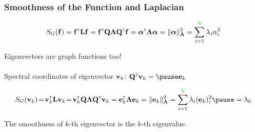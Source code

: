\documentclass{beamer}
\begin{document}

\newcommand{\topictitle}{Normalized Laplacians}

\newcommand{\topicsubtitle}{$L_{\mathrm{sym}}$ and $L_{\mathrm{rw}}$}

\MakeTopicSlide

\begin{frame}
\frametitle{Smoothness of the Function and Laplacian}
\begin{block}{}
$$
S_G(\bff)  = \bff\transpose\bL\bff =
 \bff\transpose\bQ\bLambda\bQ\transpose\bff = 
\balpha\transpose\bLambda\balpha = 
\|\balpha\|^2_{\bLambda}=\sum_{i=1}^\nodes\lambda_i\alpha_i^2
$$
 \end{block}

Eigenvectors are graph functions too!\\
\smallskip \pause
{}\\
\smallskip \pause
Spectral coordinates of eigenvector $\mathbf{v}_k$: $\bQ\transpose\bv_k =  \pause \be_k$
\pause
\begin{block}{}
$$
S_G(\bv_k)\! = \! \bv_k\transpose\bL\bv_k \!=\!
 \bv_k\transpose\bQ\bLambda\bQ\transpose\bv_k = 
\be_k\transpose\bLambda\be_k = 
\|\be_k\|^2_{\bLambda}=\sum_{i=1}^\nodes\lambda_i(\be_k)_i^2 \pause = \lambda_k
$$
 \end{block}
\pause
The smoothness of $k$-th eigenvector is the $k$-th eigenvalue.


\end{frame}
\end{document}
